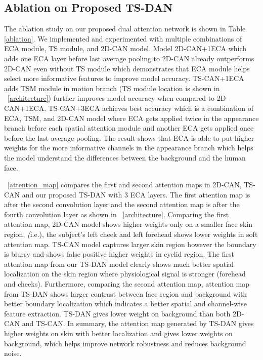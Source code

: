 \documentclass[conference]{IEEEtran}
\begin{document}
\subsection{Ablation on Proposed TS-DAN}
The ablation study on our proposed dual attention network is shown in Table \ref{ablation}. We implemented and experimented with multiple combinations of ECA module, TS module, and 2D-CAN model. Model 2D-CAN+1ECA which adds one ECA layer before last average pooling to 2D-CAN already outperforms 2D-CAN even without TS module which demonstrates that ECA module helps select more informative features to improve model accuracy. TS-CAN+1ECA adds TSM module in motion branch (TS module location is shown in \figurename~\ref{architecture}) further improves model accuracy when compared to 2D-CAN+1ECA. TS-CAN+3ECA achieves best accuracy which is a combination of ECA, TSM, and 2D-CAN model where ECA gets applied twice in the appearance branch before each spatial attention module and another ECA gets applied once before the last average pooling. The result shows that ECA is able to put higher weights for the more informative channels in the appearance branch which helps the model understand the differences between the background and the human face.

\figurename~\ref{attention_map} compares the first and second attention maps in 2D-CAN, TS-CAN and our proposed TS-DAN with 3 ECA layers. The first attention map is after the second convolution layer and the second attention map is after the fourth convolution layer as shown in \figurename~\ref{architecture}. Comparing the first attention map, 2D-CAN model shows higher weights only on a smaller face skin region, \textit(i.e.), the subject's left cheek and left forehead shows lower weights in soft attention map. TS-CAN model captures larger skin region however the boundary is blurry and shows false positive higher weights in eyelid region. The first attention map from our TS-DAN model clearly shows much better spatial localization on the skin region where physiological signal is stronger (forehead and cheeks). Furthermore, comparing the second attention map, attention map from TS-DAN shows larger contrast between face region and background with better boundary localization which indicates a better spatial and channel-wise feature extraction. TS-DAN gives lower weight on background than both 2D-CAN and TS-CAN. In summary, the attention map generated by TS-DAN gives higher weights on skin with better localization and gives lower weights on background, which helps improve network robustness and reduces background noise.
\end{document}
